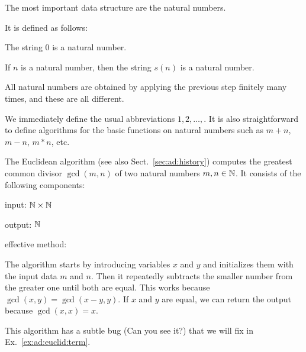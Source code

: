 \begin{example}
The most important data structure are the natural numbers.

It is defined as follows:
\begin{compactitem}
 \item The string $0$ is a natural number.
 \item If $n$ is a natural number, then the string $s(n)$ is a natural number.
 \item All natural numbers are obtained by applying the previous step finitely many times, and these are all different.
\end{compactitem}

We immediately define the usual abbreviations $1,2,\ldots,$.
It is also straightforward to define algorithms for the basic functions on natural numbers such as $m+n$, $m-n$, $m*n$, etc.
\end{example}

\begin{example}\label{ex:ad:euclid}
The Euclidean algorithm (see also Sect.~\ref{sec:ad:history}) computes the greatest common divisor $\gcd(m,n)$ of two natural numbers $m,n\in\mathbb{N}$.
It consists of the following components:
\begin{compactitem}
\item input: $\mathbb{N}\times\mathbb{N}$
\item output: $\mathbb{N}$
\item effective method:
\begin{acode}
\end{acode}
\end{compactitem}

The algorithm starts by introducing variables $x$ and $y$ and initializes them with the input data $m$ and $n$.
Then it repeatedly subtracts the smaller number from the greater one until both are equal.
This works because $\gcd(x,y)=\gcd(x-y,y)$.
If $x$ and $y$ are equal, we can return the output because $\gcd(x,x)=x$.
\medskip

This algorithm has a subtle bug (Can you see it?) that we will fix in Ex.~\ref{ex:ad:euclid:term}.
\end{example}


